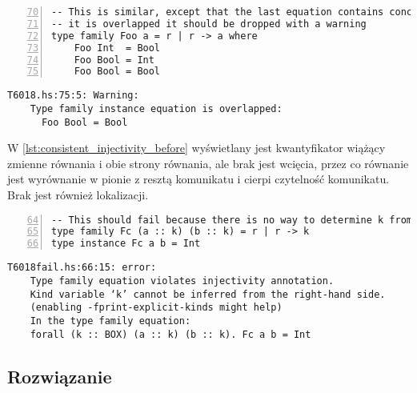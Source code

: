 \begin{lstlisting}[numbers=left,firstnumber=70,label={lst:consistent_overlapped_code},
                   caption={Fragment testu T6018 z zamkniętą rodziną typów z równaniami o nachodzących na siebie dziedzinach.}]
-- This is similar, except that the last equation contains concrete type.  Since
-- it is overlapped it should be dropped with a warning
type family Foo a = r | r -> a where
    Foo Int  = Bool
    Foo Bool = Int
    Foo Bool = Bool
\end{lstlisting}

\begin{lstlisting}[language={},label={lst:consistent_overlapped_before},
                   caption={Ostrzeżenie generowane przez kompilator w przypadku \ref{lst:consistent_overlapped_code} przed wprowadzeniem zmian.}]
T6018.hs:75:5: Warning:
    Type family instance equation is overlapped:
      Foo Bool = Bool
\end{lstlisting}

W \ref{lst:consistent_injectivity_before} wyświetlany jest kwantyfikator wiążący zmienne równania i obie strony równania, ale brak jest wcięcia, przez co równanie jest wyrównanie w pionie z resztą komunikatu i cierpi czytelność komunikatu. Brak jest również lokalizacji.

\begin{lstlisting}[numbers=left,firstnumber=64,label={lst:consistent_injectivity_code},
                   caption={Fragment testu T6018fail z równaniem rodziny typów nie spełniającej warunku różnowartościowości.}]
-- This should fail because there is no way to determine k from the RHS
type family Fc (a :: k) (b :: k) = r | r -> k
type instance Fc a b = Int
\end{lstlisting}

\begin{lstlisting}[language={},label={lst:consistent_injectivity_before},
                   caption={Błąd generowany przez kompilator w przypadku \ref{lst:consistent_injectivity_code} przed wprowadzeniem zmian.}]
T6018fail.hs:66:15: error:
    Type family equation violates injectivity annotation.
    Kind variable ‘k’ cannot be inferred from the right-hand side.
    (enabling -fprint-explicit-kinds might help)
    In the type family equation:
    forall (k :: BOX) (a :: k) (b :: k). Fc a b = Int
\end{lstlisting}


\subsection{Rozwiązanie} %

